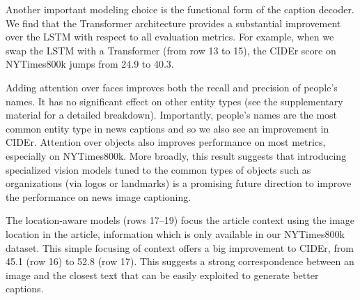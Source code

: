 Another important modeling choice is the functional form of the caption
decoder. We find that the Transformer architecture provides a substantial
improvement over the LSTM with respect to all evaluation metrics. For example,
when we swap the LSTM with a Transformer (from row 13 to 15), the CIDEr score
on NYTimes800k jumps from 24.9 to 40.3.


Adding attention over faces improves both the recall and precision of people's
names. It has no significant effect on other entity types (see the
supplementary material for a detailed breakdown). Importantly, people's names
are the most common entity type in news captions and so we also see an
improvement in CIDEr. Attention over objects also improves performance on most
metrics, especially on NYTimes800k. More broadly, this result suggests that
introducing specialized vision models tuned to the common types of objects such
as organizations (via logos or landmarks) is a promising future direction to
improve the performance on news image captioning.


The location-aware models (rows 17--19) focus the article context using the
image location in the article, information which is only available in our
NYTimes800k dataset. This simple focusing of context offers a big improvement
to CIDEr, from 45.1 (row 16) to 52.8 (row 17). This suggests a strong
correspondence between an image and the closest text that can be easily
exploited to generate better captions.

